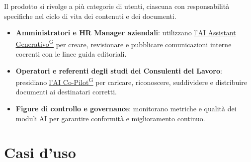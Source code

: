 ﻿\documentclass[a4paper,12pt]{article}
\providecommand{\glslink}[2]{\href{https://alittlebyte-19.github.io/Documentazione/glossario.html\#gls-#1}{\underline{#2}\textsuperscript{\scriptsize G}}}
\begin{document}
Il prodotto si rivolge a più categorie di utenti, ciascuna con responsabilità specifiche nel ciclo di vita dei contenuti e dei documenti.
\begin{itemize}
    \item \textbf{Amministratori e HR Manager aziendali}: utilizzano \glslink{ai-assistant-generativo}{l'AI Assistant Generativo} per creare, revisionare e pubblicare comunicazioni interne coerenti con le linee guida editoriali.
    \item \textbf{Operatori e referenti degli studi dei Consulenti del Lavoro}: presidiano \glslink{ai-co-pilot-per-consulenti-del-lavoro-cdl}{l'AI Co-Pilot} per caricare, riconoscere, suddividere e distribuire documenti ai destinatari corretti.
    \item \textbf{Figure di controllo e governance}: monitorano metriche e qualità dei moduli AI per garantire conformità e miglioramento continuo.
\end{itemize}

\section{Casi d'uso}
\end{document}
